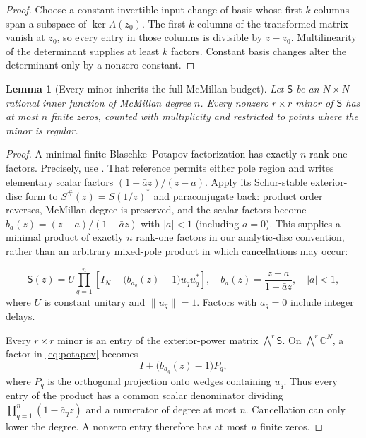 \documentclass[11pt]{article}
\newtheorem{lemma}[theorem]{Lemma}
\theoremstyle{definition}
\theoremstyle{remark}
\newcommand{\C}{\mathbb{C}}
\begin{document}
\begin{proof}
Choose a constant invertible input change of basis whose first $k$ columns
span a subspace of $\ker A(z_0)$.  The first $k$ columns of the transformed
matrix vanish at $z_0$, so every entry in those columns is divisible by
$z-z_0$.  Multilinearity of the determinant supplies at least $k$ factors.
Constant basis changes alter the determinant only by a nonzero constant.
\end{proof}

\begin{lemma}[Every minor inherits the full McMillan budget]
\label{lem:minordegree}
Let $\mathsf S$ be an $N\times N$ rational inner function of McMillan degree
$n$.  Every nonzero $r\times r$ minor of $\mathsf S$ has at most $n$ finite
zeros, counted with multiplicity and restricted to points where the minor is
regular.
\end{lemma}

\begin{proof}
A minimal finite Blaschke--Potapov factorization has exactly $n$ rank-one
factors. Precisely, use \cite[Theorem~3.1, square case Eq.~(3.5)]{AlpayJorgensenLewkowicz2016}.
That reference permits either pole region and writes elementary scalar factors
$(1-\bar a z)/(z-a)$. Apply its Schur-stable exterior-disc form to
$S^\#(z)=S(1/\bar z)^*$ and paraconjugate back: product order reverses,
McMillan degree is preserved, and the scalar factors become
$b_a(z)=(z-a)/(1-\bar a z)$ with $|a|<1$ (including $a=0$).
This supplies a minimal product of exactly $n$ rank-one factors in our
analytic-disc convention, rather than an arbitrary mixed-pole product in
which cancellations may occur:

\begin{equation}\label{eq:potapov}
 \mathsf S(z)=U\prod_{q=1}^{n}
 \left[I_N+\bigl(b_{a_q}(z)-1\bigr)u_qu_q^*\right],
 \quad
 b_a(z)=\frac{z-a}{1-\bar a z},\quad |a|<1,
\end{equation}
where $U$ is constant unitary and $\|u_q\|=1$.  Factors with $a_q=0$
include integer delays.

Every $r\times r$ minor is an entry of the exterior-power matrix
$\bigwedge^r\mathsf S$.  On $\bigwedge^r\C^N$, a factor in
\eqref{eq:potapov} becomes
\[
 I+\bigl(b_{a_q}(z)-1\bigr)P_q,
\]
where $P_q$ is the orthogonal projection onto wedges containing $u_q$.
Thus every entry of the product has a common scalar denominator dividing
$\prod_{q=1}^n(1-\bar a_qz)$ and a numerator of degree at most $n$.
Cancellation can only lower the degree.  A nonzero entry therefore has at
most $n$ finite zeros.
\end{proof}
\end{document}
